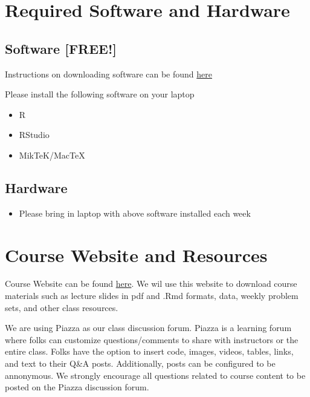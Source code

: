 \documentclass[11pt,]{article}
\providecommand{\tightlist}{%
  \setlength{\itemsep}{0pt}\setlength{\parskip}{0pt}}
\begin{document}
\section{Required Software and
Hardware}\label{required-software-and-hardware}

\subsection{Software {[}FREE!{]}}\label{software-free}

Instructions on downloading software can be found
\href{https://github.com/ozanj/rclass/raw/master/educ263_todo.pdf}{here}

Please install the following software on your laptop

\begin{itemize}
\tightlist
\item
  R
\item
  RStudio
\item
  MikTeK/MacTeX
\end{itemize}

\subsection{Hardware}\label{hardware}

\begin{itemize}
\tightlist
\item
  Please bring in laptop with above software installed each week
\end{itemize}

\section{Course Website and
Resources}\label{course-website-and-resources}

Course Website can be found
\href{https://ozanj.github.io/rclass/}{here}. We wil use this website to
download course materials such as lecture slides in pdf and .Rmd
formats, data, weekly problem sets, and other class resources.

We are using Piazza as our class discussion forum. Piazza is a learning
forum where folks can customize questions/comments to share with
instructors or the entire class. Folks have the option to insert code,
images, videos, tables, links, and text to their Q\&A posts.
Additionally, posts can be configured to be annonymous. We strongly
encourage all questions related to course content to be posted on the
Piazza discussion forum.
\end{document}
